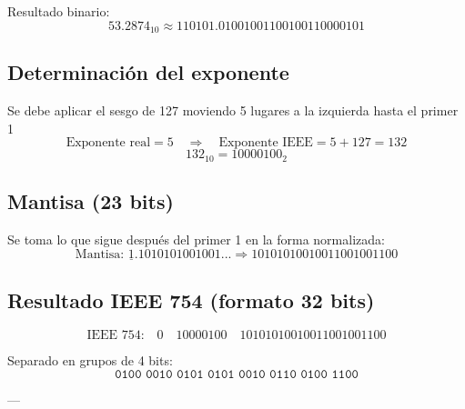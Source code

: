 \documentclass[a4paper,12pt]{article}
\begin{document}
\begin{center}
		Resultado binario: 
		\[
		53.2874_{10} \approx 110101.01001001100100110000101
		\]
		
		\subsection*{Determinación del exponente}
		
		Se debe aplicar el sesgo de 127 moviendo 5 lugares a la izquierda hasta el primer 1
		\vspace{-0.5em}
		\[
		\text{Exponente real} = 5 \quad \Rightarrow \quad \text{Exponente IEEE} = 5 + 127 = 132
		\]
		\vspace{-0.5em}
		\[
		132_{10} = 10000100_2
		\]
		
		\subsection*{Mantisa (23 bits)}
		
		Se toma lo que sigue después del primer 1 en la forma normalizada:
		\vspace{-0.5em}
		\[
		\text{Mantisa: } \underline{1}.1010101001001... \Rightarrow 10101010010011001001100
		\]
		
		\subsection*{Resultado IEEE 754 (formato 32 bits)}
		
		\[
		\text{IEEE 754:} \quad 
		\boxed{0} \quad \boxed{10000100} \quad \boxed{10101010010011001001100}
		\]
		
		Separado en grupos de 4 bits:
		\vspace{-0.5em}
		\[
		\texttt{0100\ 0010\ 0101\ 0101\ 0010\ 0110\ 0100\ 1100}
		\]
		
		---	
	\end{center}
\end{document}
